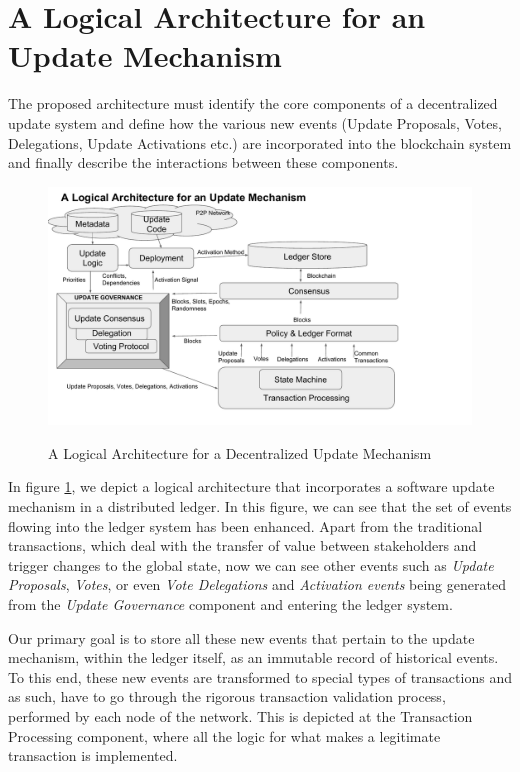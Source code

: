 \section{A Logical Architecture for an Update Mechanism}
The proposed architecture must identify the core components of a decentralized update system and define how the various new events (Update Proposals, Votes, Delegations, Update Activations etc.) are incorporated into the blockchain system and finally describe the interactions between these components.

\begin{figure}[H]
    \caption{A Logical Architecture for a Decentralized Update Mechanism}
    \centering
    \includegraphics[width=1.0 \columnwidth,keepaspectratio]{figures/logical_architecture_v3.pdf}
    \label{logarch}
\end{figure}

In figure \ref{logarch}, we depict a logical architecture that incorporates a software update mechanism in a distributed ledger. In this figure, we can see that the set of events flowing into the ledger system has been enhanced. Apart from the traditional transactions, which deal with the transfer of value between stakeholders and trigger changes to the global state, now we can see other events such as \emph{Update Proposals}, \emph{Votes}, or even \emph{Vote Delegations} and \emph{Activation events} being generated from the \emph{Update Governance} component and entering the ledger system.

Our primary goal is to store all these new events that pertain to the update mechanism, within the ledger itself, as an immutable record of historical events. To this end, these new events are transformed to special types of transactions and as such, have to go through the rigorous transaction validation process, performed by each node of the network. This is depicted at the Transaction Processing component, where all the logic for what makes a legitimate transaction is implemented.


